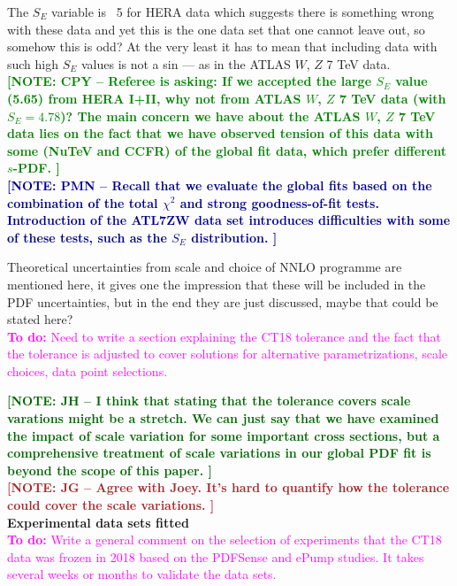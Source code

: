 \documentclass[aps,prd,amsmath,nofootinbib,floatfix,fleqn]{revtex4}
\newcommand{\TODO}[1]{\textcolor{magenta}{
\quad\vspace{3pt} \\ {\bf To do:} #1 \\
}}
\newcommand{\NOTECPY}[1]{\textcolor{green}{ \bf[NOTE: CPY -- #1 ]}}
\newcommand{\NOTEJH}[1]{\textcolor{darkgreen}{ \bf[NOTE: JH -- #1 ]}}
\newcommand{\NOTEPN}[1]{\textcolor{darkblue}{ \bf[NOTE: PMN -- #1 ]}}
\newcommand{\NOTEJG}[1]{\textcolor{brown}{ \bf[NOTE: JG -- #1 ]}}
\begin{document}
\noindent
 The $S_E$ variable is ~5 for HERA data which suggests there is something wrong with these data and yet this is the one data set that one cannot leave out, so somehow this is odd? At the very least it has to mean that including data with such high $S_E$ values is not a sin — as in the ATLAS $W$, $Z$ 7 TeV data. \\

\NOTECPY{Referee is asking: If we accepted the large $S_E$ value (5.65) from HERA I+II, why not from ATLAS $W$, $Z$ 7 TeV data (with $S_E=4.78$)?
The main concern we have about the  ATLAS $W$, $Z$ 7 TeV data lies on the fact that we have observed tension of this data with some (NuTeV and CCFR) of the global fit data, which prefer different $s$-PDF. 
}\\
\NOTEPN{Recall that we evaluate the global fits based on the combination of the total $\chi^2$ and strong goodness-of-fit tests. Introduction of the ATL7ZW data set introduces difficulties with some of these tests, such as the $S_E$ distribution.}

\noindent
Theoretical uncertainties from scale and choice of NNLO programme are mentioned here, it gives one the impression that these will be included in the PDF uncertainties, but in the end they are just discussed, maybe that could be stated here? 
\TODO{Need to write a section explaining the CT18 tolerance and the fact that the tolerance is adjusted to cover solutions for alternative parametrizations, scale choices, data point selections.}

\NOTEJH{I think that stating that the tolerance covers scale varations might be a stretch. We can just say that we have examined the impact of scale variation for some important cross sections, but a comprehensive treatment of scale variations in our global PDF fit is beyond the scope of this paper.}\\

\NOTEJG{Agree with Joey. It's hard to quantify how the tolerance could cover the scale variations.}\\

{\bf Experimental data sets fitted}
\TODO{Write a general comment on the selection of experiments that the CT18 data was frozen in 2018 based on the PDFSense and ePump studies. It takes several weeks or months to validate the data sets.}
\end{document}
